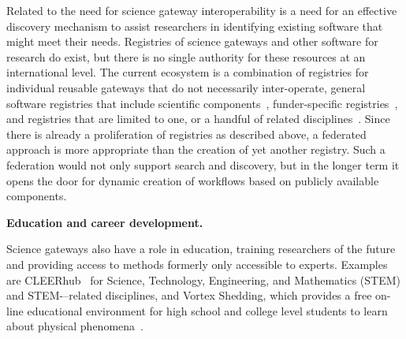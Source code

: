 \documentclass[review]{elsarticle}
\newcommand{\changedtext}[1]{
	{#1}
}
\begin{document}
Related to the need for science gateway interoperability is a need for an effective discovery mechanism to assist researchers in identifying existing software that might meet their needs. Registries of science gateways and other software for research do exist, but there is no single authority for these resources at an international level. The current ecosystem is a combination of registries for individual reusable gateways \cite{alces-54, hubzero-55} that do not necessarily inter-operate, general software registries that include scientific components~\cite{github-56,openhatch-57}, funder-specific registries~\cite{canarie-58}, and registries that are limited to one, or a handful of related disciplines~\cite{iplant-59,cyverse-60}. Since there is already a proliferation of registries as described above, a federated approach is more appropriate than the creation of yet another registry. Such a federation would not only support search and discovery, but in the longer term it opens the door for dynamic creation of workflows based on publicly available components.

\changedtext{\textbf{Education and career development.}}
Science gateways also have a role in education, training researchers of the future and providing access to methods formerly only accessible to experts. Examples are CLEERhub~\cite{cleerhub-74} for Science, Technology, Engineering, and Mathematics (STEM) and STEM-–related disciplines, and Vortex Shedding, which provides a free on-line educational environment for high school and college level students to learn about physical phenomena~\cite{vortex-75}.
\end{document}
